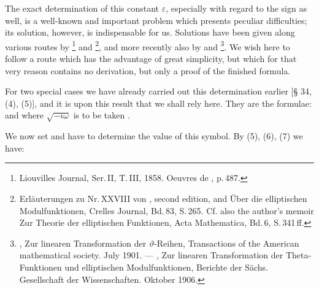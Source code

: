
The exact determination of this constant $\varepsilon$, especially with regard to the sign as well, is a well-known and important problem which presents peculiar difficulties; its solution, however, is indispensable for us. Solutions have been given along various routes by \footnote{Liouvilles Journal, Ser.\,II, T.\,III, 1858. Oeuvres de , p.\,487.} and \footnote{Erläuterungen zu Nr.\,XXVIII von , second edition, and \glqq{}Über die elliptischen Modulfunktionen\grqq{}, Crelles Journal, Bd.\,83, S.\,265. Cf. also the author's memoir \glqq{}Zur Theorie der elliptischen Funktionen\grqq{}, Acta Mathematica, Bd.\,6, S.\,341\,ff.}, and more recently also by  and \footnote{, Zur linearen Transformation der $\vartheta$-Reihen, Transactions of the American mathematical society. July 1901. — , Zur linearen Transformation der Theta-Funktionen und elliptischen Modulfunktionen, Berichte der Sächs. Gesellschaft der Wissenschaften. Oktober 1906.}. We wish here to follow a route which has the advantage of great simplicity, but which for that very reason contains no derivation, but only a proof of the finished formula.

For two special cases we have already carried out this determination earlier [§ 34, (4), (5)], and it is upon this result that we shall rely here. They are the formulae:
and
where $\sqrt{-i\omega}$ is to be taken .

We now set
and have to determine the value of this symbol. By (5), (6), (7) we have:
